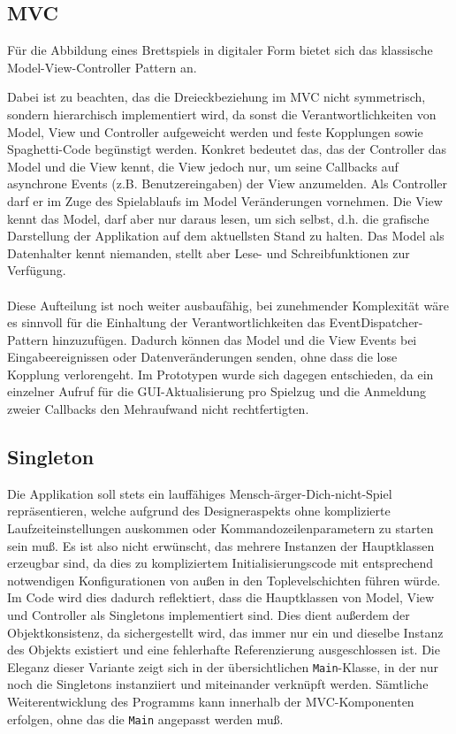 \documentclass[conference]{IEEEtran}
\begin{document}
\subsection{MVC}
  F\"ur die Abbildung eines Brettspiels in digitaler Form bietet sich das klassische Model-View-Controller Pattern an.

  Dabei ist zu beachten, das die Dreieckbeziehung im MVC nicht symmetrisch, sondern hierarchisch implementiert wird, da sonst die Verantwortlichkeiten
  von Model, View und Controller aufgeweicht werden und feste Kopplungen sowie Spaghetti-Code beg\"unstigt werden. Konkret bedeutet das, das der Controller das Model und die View kennt, die View jedoch nur, um seine Callbacks auf asynchrone Events (z.B. Benutzereingaben) der View anzumelden. Als Controller darf er im Zuge des Spielablaufs im Model Ver\"anderungen vornehmen. Die View kennt das Model, darf aber nur daraus lesen, um sich selbst, d.h. die grafische Darstellung der Applikation auf dem aktuellsten Stand zu halten. Das Model als Datenhalter kennt niemanden, stellt aber Lese- und Schreibfunktionen zur Verf\"ugung. \\\\
  Diese Aufteilung ist noch weiter ausbauf\"ahig, bei zunehmender Komplexit\"at w\"are es sinnvoll f\"ur die
  Einhaltung der Verantwortlichkeiten das EventDispatcher-Pattern hinzuzuf\"ugen. Dadurch k\"onnen das Model und die View Events bei Eingabeereignissen oder Datenver\"anderungen senden, ohne dass die lose Kopplung verlorengeht. Im Prototypen wurde sich dagegen entschieden, da ein einzelner Aufruf f\"ur die GUI-Aktualisierung pro Spielzug und die Anmeldung zweier Callbacks den Mehraufwand nicht rechtfertigten.

\subsection{Singleton}

Die Applikation soll stets ein lauff\"ahiges Mensch-\"arger-Dich-nicht-Spiel repr\"asentieren, welche aufgrund des Designeraspekts ohne komplizierte Laufzeiteinstellungen auskommen oder Kommandozeilenparametern zu starten sein mu\ss. Es ist also nicht erw\"unscht, das mehrere Instanzen der Hauptklassen erzeugbar sind, da dies zu kompliziertem Initialisierungscode mit entsprechend notwendigen Konfigurationen von au\ss en in den Toplevelschichten f\"uhren w\"urde. Im Code wird dies dadurch reflektiert, dass die Hauptklassen von Model, View und Controller als Singletons implementiert sind. Dies dient au{\ss}erdem der Objektkonsistenz, da sichergestellt wird, das immer nur ein und dieselbe Instanz des Objekts existiert und eine fehlerhafte Referenzierung ausgeschlossen ist.
Die Eleganz dieser Variante zeigt sich in der \"ubersichtlichen \texttt{Main}-Klasse, in der nur noch die Singletons instanziiert und miteinander verkn\"upft werden. S\"amtliche Weiterentwicklung des Programms kann innerhalb der MVC-Komponenten erfolgen, ohne das die \texttt{Main} angepasst werden mu\ss .
\end{document}
